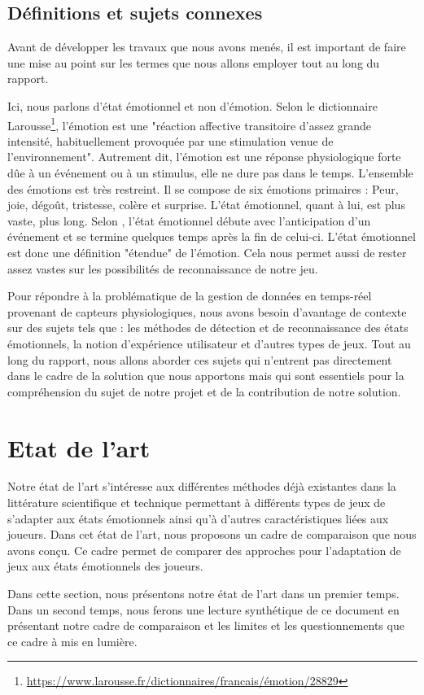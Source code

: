 \documentclass[11pt]{article}
\begin{document}
	\subsection{Définitions et sujets connexes}\label{sec:connexe}
		Avant de développer les travaux que nous avons menés, il est important de faire une mise au point sur les termes que nous allons employer tout au long du rapport.\par
		Ici, nous parlons d'état émotionnel et non d'émotion.
		Selon le dictionnaire Larousse\footnote{\href{https://www.larousse.fr/dictionnaires/francais/émotion/28829}{https://www.larousse.fr/dictionnaires/francais/émotion/28829}}, l'émotion est une "réaction affective transitoire d'assez grande intensité, habituellement provoquée par une stimulation venue de l'environnement". 
		Autrement dit, l'émotion est une réponse physiologique forte dûe à un événement ou à un stimulus, elle ne dure pas dans le temps.
		L'ensemble des émotions est très restreint.
		Il se compose de six émotions primaires : Peur, joie, dégoût, tristesse, colère et surprise. 
		L'état émotionnel, quant à lui, est plus vaste, plus long.
		Selon \cite{gal_2019}, l'état émotionnel débute avec l'anticipation d'un événement et se termine quelques temps après la fin de celui-ci.
		L'état émotionnel est donc une définition "étendue" de l'émotion.
		Cela nous permet aussi de rester assez vastes sur les possibilités de reconnaissance de notre jeu.\par
		Pour répondre à la problématique de la gestion de données en temps-réel provenant de capteurs physiologiques, nous avons besoin d'avantage de contexte sur des sujets tels que : les méthodes de détection et de reconnaissance des états émotionnels, la notion d'expérience utilisateur et d'autres types de jeux.
		Tout au long du rapport, nous allons aborder ces sujets qui n'entrent pas directement dans le cadre de la solution que nous apportons mais qui sont essentiels pour la compréhension du sujet de notre projet et de la contribution de notre solution.

\section{Etat de l'art}\label{sec:etatart}
	Notre état de l'art s'intéresse aux différentes méthodes déjà existantes dans la littérature scientifique et technique permettant à différents types de jeux de s'adapter aux états émotionnels ainsi qu'à d'autres caractéristiques liées aux joueurs.
	Dans cet état de l'art, nous proposons un cadre de comparaison que nous avons conçu.
	Ce cadre permet de comparer des approches pour l'adaptation de jeux aux états émotionnels des joueurs. \par
	Dans cette section, nous présentons notre état de l'art dans un premier temps.
	Dans un second temps, nous ferons une lecture synthétique de ce document en présentant notre cadre de comparaison et les limites et les questionnements que ce cadre à mis en lumière.
\end{document}
